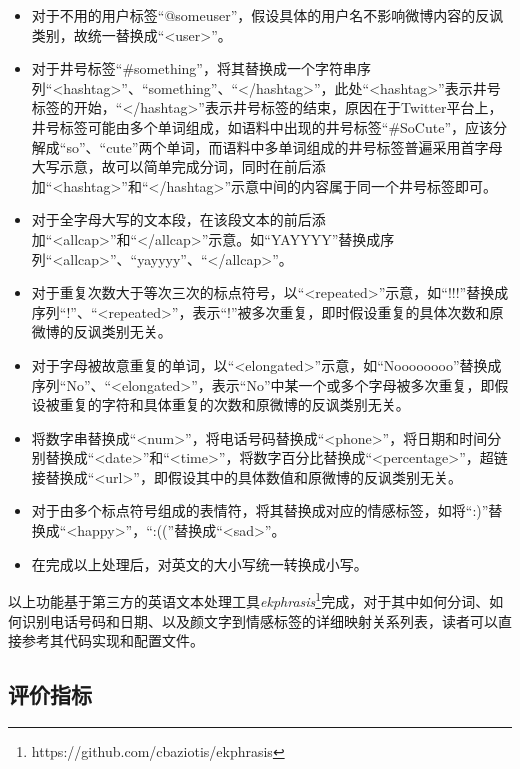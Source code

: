 \begin{itemize}

\item 对于不用的用户标签“@someuser”，假设具体的用户名不影响微博内容的反讽类别，故统一替换成“<user>”。

\item 对于井号标签“\#something”，将其替换成一个字符串序列“<hashtag>”、“something”、“</hashtag>”，此处“<hashtag>”表示井号标签的开始，“</hashtag>”表示井号标签的结束，原因在于Twitter平台上，井号标签可能由多个单词组成，如语料中出现的井号标签“\#SoCute”，应该分解成“so”、“cute”两个单词，而语料中多单词组成的井号标签普遍采用首字母大写示意，故可以简单完成分词，同时在前后添加“<hashtag>”和“</hashtag>”示意中间的内容属于同一个井号标签即可。

\item 对于全字母大写的文本段，在该段文本的前后添加“<allcap>”和“</allcap>”示意。如“YAYYYY”替换成序列“<allcap>”、“yayyyy”、“</allcap>”。

\item 对于重复次数大于等次三次的标点符号，以“<repeated>”示意，如“!!!”替换成序列“!”、“<repeated>”，表示“!”被多次重复，即时假设重复的具体次数和原微博的反讽类别无关。

\item 对于字母被故意重复的单词，以“<elongated>”示意，如“Noooooooo”替换成序列“No”、“<elongated>”，表示“No”中某一个或多个字母被多次重复，即假设被重复的字符和具体重复的次数和原微博的反讽类别无关。

\item 将数字串替换成“<num>”，将电话号码替换成“<phone>”，将日期和时间分别替换成“<date>”和“<time>”，将数字百分比替换成“<percentage>”，超链接替换成“<url>”，即假设其中的具体数值和原微博的反讽类别无关。

\item 对于由多个标点符号组成的表情符，将其替换成对应的情感标签，如将“:)”替换成“<happy>”，“:((”替换成“<sad>”。

\item 在完成以上处理后，对英文的大小写统一转换成小写。

\end{itemize}

以上功能基于第三方的英语文本处理工具\textit{ekphrasis}\footnote{https://github.com/cbaziotis/ekphrasis}完成，对于其中如何分词、如何识别电话号码和日期、以及颜文字到情感标签的详细映射关系列表，读者可以直接参考其代码实现和配置文件。

\subsection{评价指标}

